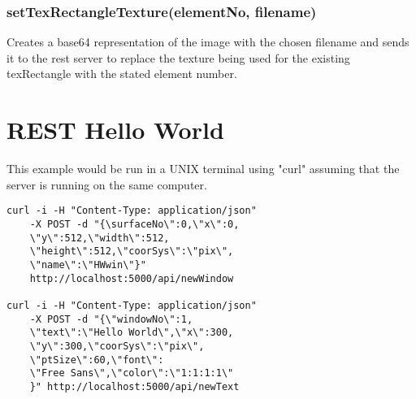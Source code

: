 \documentclass{acm_proc_article-sp}
\begin{document}
\subsubsection{setTexRectangleTexture(elementNo, filename)}
Creates a base64 representation of the image with the chosen filename and sends it to the rest server to replace the texture being used for the existing texRectangle with the stated element number.


\section{REST Hello World}
This example would be run in a UNIX terminal using "curl" assuming that the server is running on the same computer.

\begin{lstlisting}[frame=single]
curl -i -H "Content-Type: application/json" 
	-X POST -d "{\surfaceNo\":0,\"x\":0,
	\"y\":512,\"width\":512,
	\"height\":512,\"coorSys\":\"pix\",
	\"name\":\"HWwin\"}"
	http://localhost:5000/api/newWindow

curl -i -H "Content-Type: application/json" 
	-X POST -d "{\"windowNo\":1,
	\"text\":\"Hello World\",\"x\":300,
	\"y\":300,\"coorSys\":\"pix\",
	\"ptSize\":60,\"font\":
	\"Free Sans\",\"color\":\"1:1:1:1\"
	}" http://localhost:5000/api/newText


\end{lstlisting}
\end{document}
